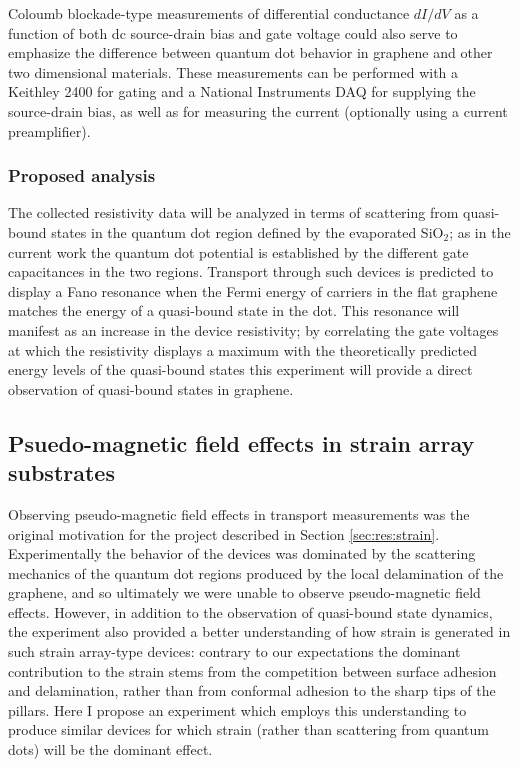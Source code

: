 \documentclass[edeposit,fullpage,draftthesis]{uiucthesis2009}
\begin{document}
            Coloumb blockade-type measurements of differential conductance $dI/dV$ as a function of
            both dc source-drain bias and gate voltage could also serve to emphasize the difference
            between quantum dot behavior in graphene and other two dimensional materials. These 
            measurements can be performed with a Keithley 2400 for gating and a National Instruments DAQ
            for supplying the source-drain bias, as well as for measuring the current (optionally using
            a current preamplifier).
        
        \subsubsection*{Proposed analysis}
        
            The collected resistivity data will be analyzed in terms of scattering from quasi-bound
            states in the quantum dot region defined by the evaporated SiO$_2$; as in the current work
            the quantum dot potential is established by the different gate capacitances in the two regions.
            Transport through such devices is predicted to display a Fano
            resonance when the Fermi energy of carriers in the flat graphene matches the energy of a quasi-bound
            state in the dot. This resonance will manifest as an increase in the device resistivity; by
            correlating the gate voltages at which the resistivity displays a maximum with the theoretically
            predicted energy levels of the quasi-bound states this experiment will provide a direct observation
            of quasi-bound states in graphene.
            
        
    \subsection{Psuedo-magnetic field effects in strain array substrates}
        
            Observing pseudo-magnetic field effects in transport measurements was the original motivation
            for the project described in Section \ref{sec:res:strain}. Experimentally the behavior of the
            devices was dominated by the scattering mechanics of the quantum dot regions produced by 
            the local delamination of the graphene, and so ultimately we were unable to observe pseudo-magnetic
            field effects. However, in addition to the observation of quasi-bound state dynamics, the experiment
            also provided a better understanding of how strain is generated in such strain array-type devices: 
            contrary to our expectations the dominant contribution to the strain stems from the 
            competition between surface adhesion and delamination, rather than from conformal adhesion to the sharp
            tips of the pillars.
            Here I propose an experiment which employs this understanding to produce similar devices for which strain
            (rather than scattering from quantum dots) will be the dominant effect.
            
\end{document}
